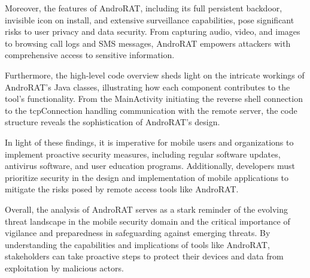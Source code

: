 \documentclass[12pt]{article}
\begin{document}
Moreover, the features of AndroRAT, including its full persistent backdoor, invisible icon on install, and extensive surveillance capabilities, pose significant risks to user privacy and data security. From capturing audio, video, and images to browsing call logs and SMS messages, AndroRAT empowers attackers with comprehensive access to sensitive information.

Furthermore, the high-level code overview sheds light on the intricate workings of AndroRAT's Java classes, illustrating how each component contributes to the tool's functionality. From the MainActivity initiating the reverse shell connection to the tcpConnection handling communication with the remote server, the code structure reveals the sophistication of AndroRAT's design.

In light of these findings, it is imperative for mobile users and organizations to implement proactive security measures, including regular software updates, antivirus software, and user education programs. Additionally, developers must prioritize security in the design and implementation of mobile applications to mitigate the risks posed by remote access tools like AndroRAT.

Overall, the analysis of AndroRAT serves as a stark reminder of the evolving threat landscape in the mobile security domain and the critical importance of vigilance and preparedness in safeguarding against emerging threats. By understanding the capabilities and implications of tools like AndroRAT, stakeholders can take proactive steps to protect their devices and data from exploitation by malicious actors.
\end{document}
